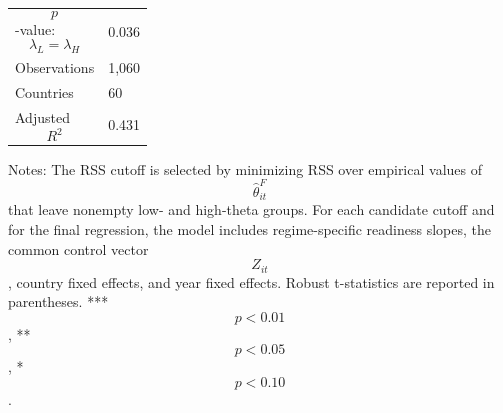 \begin{table}[H]
\begin{threeparttable}
\begin{tabularx}{\textwidth}{lY}
$$p$$-value: $$\lambda_L=\lambda_H$$ & 0.036 \\
Observations & 1,060 \\
Countries & 60 \\
Adjusted $$R^2$$ & 0.431 \\
\bottomrule
\end{tabularx}
\begin{tablenotes}[flushleft]\footnotesize
\item Notes: The RSS cutoff is selected by minimizing RSS over empirical values of $$\widehat{\theta}^{F}_{it}$$ that leave nonempty low- and high-theta groups. For each candidate cutoff and for the final regression, the model includes regime-specific readiness slopes, the common control vector $$Z_{it}$$, country fixed effects, and year fixed effects. Robust t-statistics are reported in parentheses. *** $$p<0.01$$, ** $$p<0.05$$, * $$p<0.10$$.
\end{tablenotes}
\end{threeparttable}
\end{table}
